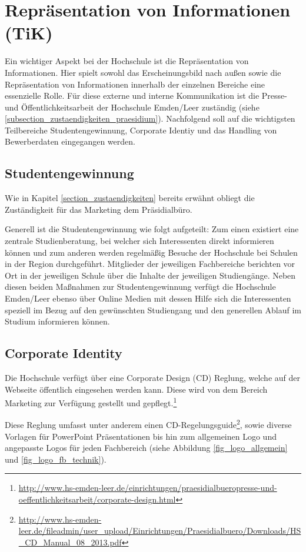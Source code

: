 \section{Repräsentation von Informationen (TiK)}
Ein wichtiger Aspekt bei der Hochschule ist die Repräsentation von Informationen. Hier spielt sowohl das Erscheinungsbild nach außen sowie die Repräsentation von Informationen innerhalb der einzelnen Bereiche eine essenzielle Rolle. Für diese externe und interne Kommunikation ist die Presse- und Öffentlichkeitsarbeit der Hochschule Emden/Leer zuständig (siehe \ref{subsection_zustaendigkeiten_praesidium}). Nachfolgend soll auf die wichtigsten Teilbereiche Studentengewinnung, Corporate Identiy und das Handling von Bewerberdaten eingegangen werden.

\subsection{Studentengewinnung}
Wie in Kapitel \ref{section_zustaendigkeiten} bereits erwähnt obliegt die Zuständigkeit für das Marketing dem Präsidialbüro. 

Generell ist die Studentengewinnung wie folgt aufgeteilt: Zum einen existiert eine zentrale Studienberatung, bei welcher sich Interessenten direkt informieren können und zum anderen werden regelmäßig Besuche der Hochschule bei Schulen in der Region durchgeführt. Mitglieder der jeweiligen Fachbereiche berichten vor Ort in der jeweiligen Schule über die Inhalte der jeweiligen Studiengänge. Neben diesen beiden Maßnahmen zur Studentengewinnung verfügt die Hochschule Emden/Leer ebenso über Online Medien mit dessen Hilfe sich die Interessenten speziell im Bezug auf den gewünschten Studiengang und den generellen Ablauf im Studium informieren können.

\subsection{Corporate Identity}
Die Hochschule verfügt über eine Corporate Design (CD) Reglung, welche auf der Webseite öffentlich eingesehen werden kann. Diese wird von dem Bereich Marketing zur Verfügung gestellt und gepflegt.\footnote{\url{http://www.hs-emden-leer.de/einrichtungen/praesidialbueropresse-und-oeffentlichkeitsarbeit/corporate-design.html}}

Diese Reglung umfasst unter anderem einen CD-Regelungsguide\footnote{\url{http://www.hs-emden-leer.de/fileadmin/user_upload/Einrichtungen/Praesidialbuero/Downloads/HS_CD_Manual_08_2013.pdf}}, sowie diverse Vorlagen für PowerPoint Präsentationen bis hin zum allgemeinen Logo und angepasste Logos für jeden Fachbereich (siehe Abbildung \ref{fig_logo_allgemein} und \ref{fig_logo_fb_technik}).

